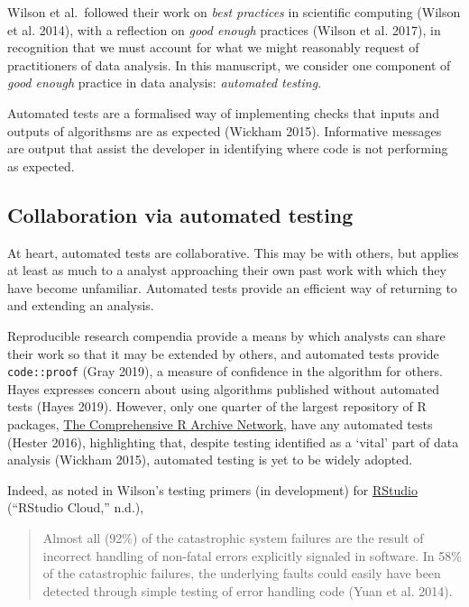 \documentclass[
]{article}
\begin{document}
Wilson et al.~followed their work on \emph{best practices} in scientific
computing (Wilson et al. 2014), with a reflection on \emph{good enough}
practices (Wilson et al. 2017), in recognition that we must account for
what we might reasonably request of practitioners of data analysis. In
this manuscript, we consider one component of \emph{good enough}
practice in data analysis: \emph{automated testing}.

Automated tests are a formalised way of implementing checks that inputs
and outputs of algorithsms are as expected (Wickham 2015). Informative
messages are output that assist the developer in identifying where code
is not performing as expected.

\hypertarget{collaboration-via-automated-testing}{%
\subsection{Collaboration via automated
testing}\label{collaboration-via-automated-testing}}

At heart, automated tests are collaborative. This may be with others,
but applies at least as much to a analyst approaching their own past
work with which they have become unfamiliar. Automated tests provide an
efficient way of returning to and extending an analysis.

Reproducible research compendia provide a means by which analysts can
share their work so that it may be extended by others, and automated
tests provide \texttt{code::proof} (Gray 2019), a measure of confidence
in the algorithm for others. Hayes expresses concern about using
algorithms published without automated tests (Hayes 2019). However, only
one quarter of the largest repository of R packages,
\href{https://cran.r-project.org/}{The Comprehensive R Archive Network},
have any automated tests (Hester 2016), highlighting that, despite
testing identified as a `vital' part of data analysis (Wickham 2015),
automated testing is yet to be widely adopted.

Indeed, as noted in Wilson's testing primers (in development) for
\href{https://rstudio.cloud/learn/primers}{RStudio} (``RStudio Cloud,''
n.d.),

\begin{quote}
Almost all (92\%) of the catastrophic system failures are the result of
incorrect handling of non-fatal errors explicitly signaled in software.
In 58\% of the catastrophic failures, the underlying faults could easily
have been detected through simple testing of error handling code (Yuan
et al. 2014).
\end{quote}
\end{document}
